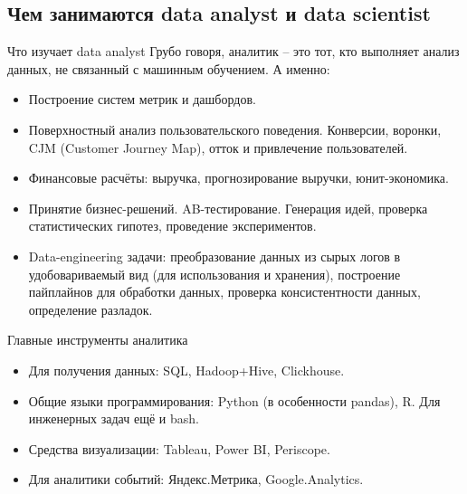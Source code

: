 \documentclass[9pt]{beamer}
\begin{document}
\subsection{Чем занимаются data analyst и data scientist}
\begin{frame}{Что изучает data analyst}
Грубо говоря, аналитик -- это тот, кто выполняет анализ данных, не связанный с машинным обучением. А именно:
\begin{itemize}
    \item Построение систем метрик и дашбордов.
    \item Поверхностный анализ пользовательского поведения. Конверсии, воронки, CJM (Customer Journey Map), отток и привлечение пользователей.
    \item Финансовые расчёты: выручка, прогнозирование выручки, юнит-экономика.
    \item Принятие бизнес-решений. AB-тестирование. Генерация идей, проверка статистических гипотез, проведение экспериментов.
    \item Data-engineering задачи: преобразование данных из сырых логов в удобовариваемый вид (для использования и хранения), построение пайплайнов для обработки данных, проверка консистентности данных, определение разладок.
\end{itemize}
\end{frame}

\begin{frame}{Главные инструменты аналитика}
    \begin{itemize}
        \item Для получения данных: SQL, Hadoop+Hive, Clickhouse.
        \item Общие языки программирования: Python (в особенности pandas), R. Для инженерных задач ещё и bash.
        \item Средства визуализации: Tableau, Power BI, Periscope.
        \item Для аналитики событий: Яндекс.Метрика, Google.Analytics.
    \end{itemize}
\end{frame}
\end{document}
